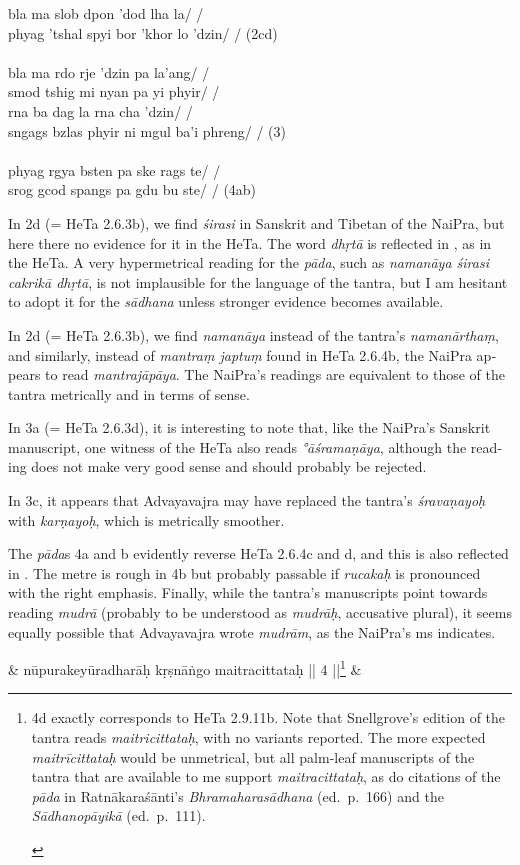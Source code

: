 \documentclass[naipra.tex]{subfiles}
\begin{document}
\begin{sanskrit}
{\begin{english}
		\begin{prosequote}%
			bla ma slob dpon 'dod lha la/ /\\
			phyag 'tshal spyi bor 'khor lo 'dzin/ / (2cd)\\
			\\
			bla ma rdo rje 'dzin pa la'ang/ /\\
			smod tshig mi nyan pa yi phyir/ /\\
			rna ba dag la rna cha 'dzin/ /\\
			sngags bzlas phyir ni mgul ba'i phreng/ / (3)\\
			\\
			phyag rgya bsten pa ske rags te/ /\\
			srog gcod spangs pa gdu bu ste/ / (4ab)
		\end{prosequote}

		In 2d (= HeTa 2.6.3b), we find \emph{śirasi} in Sanskrit and Tibetan of the NaiPra, but here there no evidence for it in the HeTa.
		The word \emph{dhṛtā} is reflected in \TIB , as in the HeTa.
		A very hypermetrical reading for the \emph{pāda}, such as \emph{namanāya śirasi cakrikā dhṛtā}, is not implausible for the language of the tantra, but I am hesitant to adopt it for the \emph{sādhana} unless stronger evidence becomes available.

		In 2d (= HeTa 2.6.3b), we find \emph{namanāya} instead of the tantra's \emph{namanārthaṃ}, and similarly, instead of \emph{mantraṃ japtuṃ} found in HeTa 2.6.4b, the NaiPra appears to read \emph{mantrajāpāya}.
		The NaiPra's readings are equivalent to those of the tantra metrically and in terms of sense.

		In 3a (= HeTa 2.6.3d), it is interesting to note that, like the NaiPra's Sanskrit manuscript, one witness of the HeTa also reads \emph{°āśramaṇāya}, although the reading does not make very good sense and should probably be rejected.

		In 3c, it appears that Advayavajra may have replaced the tantra's \emph{śravaṇayoḥ} with \emph{karṇayoḥ}, which is metrically smoother.

		The \emph{pāda}s 4a and b evidently reverse HeTa 2.6.4c and d, and this is also reflected in \TIB.
		The metre is rough in 4b but probably passable if \emph{rucakaḥ} is pronounced with the right emphasis.
		Finally, while the tantra's manuscripts point towards reading \emph{mudrā} (probably to be understood as \emph{mudrāḥ}, accusative plural), it seems equally possible that Advayavajra wrote \emph{mudrām}, as the NaiPra's ms indicates.
	\end{english}
} &
nūpurakeyūradharāḥ kṛṣnāṅgo maitracittataḥ || 4 ||\footnote{
	\begin{english}%
		4d exactly corresponds to HeTa 2.9.11b.
		Note that Snellgrove's edition of the tantra reads \emph{maitricittataḥ}, with no variants reported.
		The more expected \emph{maitrīcittataḥ} would be unmetrical, but all palm-leaf manuscripts of the tantra that are available to me support \emph{maitracittataḥ}, as do citations of the \emph{pāda} in Ratnākaraśānti's \emph{Bhramaharasādhana} (ed.\ p.\ 166) and the \emph{Sādhanopāyikā} (ed.\ p.\ 111). 
	\end{english}
} \&


\end{sanskrit}
\end{document}
